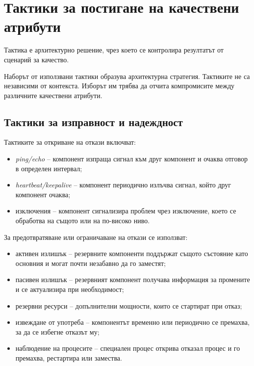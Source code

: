 \section{Тактики за постигане на качествени атрибути}\label{s:27.7}

\begin{defn}
Тактика е архитектурно решение, чрез което се контролира резултатът от сценарий за качество.
\end{defn}

Наборът от използвани тактики образува архитектурна стратегия. Тактиките не са независими от контекста. Изборът им трябва да отчита компромисите между различните качествени атрибути.

\subsection{Тактики за изправност и надеждност}\label{s:27.7.1}

Тактиките за откриване на откази включват:

\begin{itemize}
    \item \emph{ping/echo} -- компонент изпраща сигнал към друг компонент и очаква отговор в определен интервал;
    \item \emph{heartbeat/keepalive} -- компонент периодично излъчва сигнал, който друг компонент очаква;
    \item изключения -- компонент сигнализира проблем чрез изключение, което се обработва на същото или на по-високо ниво.
\end{itemize}

За предотвратяване или ограничаване на откази се използват:

\begin{itemize}
    \item активен излишък -- резервните компоненти поддържат същото състояние като основния и могат почти незабавно да го заместят;
    \item пасивен излишък -- резервният компонент получава информация за промените и се актуализира при необходимост;
    \item резервни ресурси -- допълнителни мощности, които се стартират при отказ;
    \item извеждане от употреба -- компонентът временно или периодично се премахва, за да се избегне отказът му;
    \item наблюдение на процесите -- специален процес открива отказал процес и го премахва, рестартира или замества.
\end{itemize}

